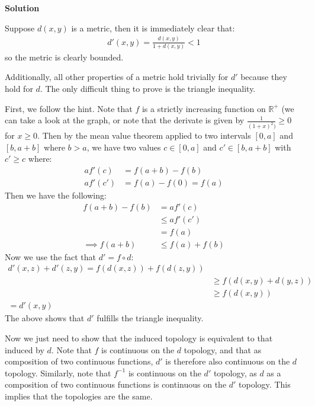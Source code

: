 \documentclass[12pt]{article}
\newcounter{AnswerCounter}
\newcounter{SubAnswerCounter}
\newenvironment{answer}[0]{
  \setcounter{SubAnswerCounter}{1}
  \bigskip
  \textbf{Solution \arabic{AnswerCounter}}
  \\
  \begin{small}
}{
  \end{small}
  \stepcounter{AnswerCounter}
}
\begin{document}
\begin{answer}[Page 127, \#11]
Suppose $d(x,y)$ is a metric, then it is immediately clear that:
\begin{align*}
d'(x,y) = \frac{d(x,y)}{1 + d(x,y)} < 1 \tag{$\forall x,y$}
\end{align*}
so the metric is clearly bounded.

Additionally, all other properties of a metric hold trivially for $d'$ because they hold for $d$. The only difficult thing to prove is the triangle inequality.

First, we follow the hint. Note that $f$ is a strictly increasing function on $\mathbb{R}^+$ (we can take a look at the graph, or note that the derivate is given by $\frac{1}{(1+x)^2)} \geq 0$ for $x \geq 0$.
Then by the mean value theorem applied to two intervals $[0,a]$ and $[b,a+b]$ where $b > a$, we have two values $c \in [0,a]$ and $c' \in [b,a+b]$ with $c' \geq c$ where:
\begin{align*}
af'(c) &=  f(a+b) - f(b) \\
af'(c') &= f(a) - f(0) = f(a)
\end{align*}
Then we have the following:
\begin{align*}
f(a+b) - f(b) &= af'(c) \\
&\leq af'(c') \tag{$f'$ is strictly increasing} \\
&= f(a) \\
\implies f(a+b) &\leq f(a) + f(b)
\end{align*}
Now we use the fact that $d' = f \circ d$:
\begin{align*}
d'(x,z) + d'(z,y) = f(d(x,z)) + f(d(z,y)) \\
&\geq f(d(x,y)+d(y,z)) \tag{using the above} \\
&\geq f(d(x,y)) \tag{by the fact that $f$ is increasing and triangle inequality applied to $d$} \\
=d'(x,y)
\end{align*}
The above shows that $d'$ fulfills the triangle inequality.

Now we just need to show that the induced topology is equivalent to that induced by $d$. Note that $f$ is continuous on the $d$ topology, and that as composition of two continuous functions, $d'$ is therefore also continuous on the $d$ topology. Similarly, note that $f^{-1}$ is continuous on the $d'$ topology, as $d$ as a composition of two continuous functions is continuous on the $d'$ topology. This implies that the topologies are the same.
\end{answer}
\end{document}
